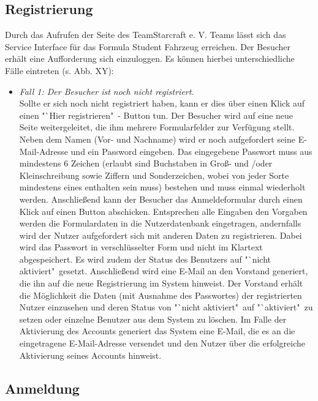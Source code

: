 \documentclass[fontsize = 12pt, paper = a4]{scrreprt}
\begin{document}
\newpage

\subsection{Registrierung}

Durch das Aufrufen der Seite des TeamStarcraft e. V. Teams lässt sich das Service Interface für das Formula Student Fahrzeug erreichen. Der Besucher erhält eine Aufforderung sich einzuloggen. Es können hierbei unterschiedliche Fälle eintreten (s. Abb. XY):

 

\begin{itemize}

\item \textit{Fall 1: Der Besucher ist noch nicht registriert.} \\
Sollte er sich noch nicht registriert haben, kann er dies über einen Klick auf einen "`Hier registrieren"\ - Button tun. Der Besucher wird auf eine neue Seite weitergeleitet, die ihm mehrere Formularfelder zur Verfügung stellt. Neben dem Namen (Vor- und Nachname) wird er noch aufgefordert seine E-Mail-Adresse und ein Password eingeben. Das eingegebene Passwort muss aus mindestens 6 Zeichen (erlaubt sind Buchstaben in Groß- und /oder Kleinschreibung sowie Ziffern und Sonderzeichen, wobei von jeder Sorte mindestens eines enthalten sein muss) bestehen und muss einmal wiederholt werden. Anschließend kann der Besucher das Anmeldeformular durch einen Klick auf einen Button abschicken. Entsprechen alle Eingaben den Vorgaben werden die Formulardaten in die Nutzerdatenbank eingetragen, andernfalls wird der Nutzer aufgefordert sich mit anderen Daten zu registrieren. Dabei wird das Passwort in verschlüsselter Form und nicht im Klartext abgespeichert. Es wird zudem der Status des Benutzers auf "`nicht aktiviert"\ gesetzt. Anschließend wird eine E-Mail an den Vorstand generiert, die ihn auf die neue Registrierung im System hinweist. Der Vorstand erhält die Möglichkeit die Daten (mit Ausnahme des Passwortes) der registrierten Nutzer einzusehen und deren Status von "`nicht aktiviert"\ auf "`aktiviert"\ zu setzen oder einzelne Benutzer aus dem System zu löschen. Im Falle der Aktivierung des Accounts generiert das System eine E-Mail, die es an die eingetragene E-Mail-Adresse versendet und den Nutzer über die erfolgreiche Aktivierung seines Accounts hinweist.

\end{itemize}

\subsection{Anmeldung}
\end{document}
